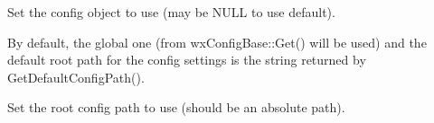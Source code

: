 

\label{wxfontmappersetconfig}


Set the config object to use (may be NULL to use default).

By default, the global one (from wxConfigBase::Get() will be used) 
and the default root path for the config settings is the string returned by
GetDefaultConfigPath().


\label{wxfontmappersetconfigpath}


Set the root config path to use (should be an absolute path).

